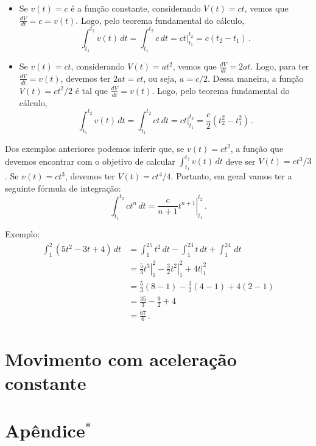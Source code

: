 \documentclass[fontsize=12pt]{scrartcl}
\begin{document}
\begin{itemize}
\item Se $v(t)=c$ é a função constante, considerando $V(t)=ct$, vemos
  que $\frac{dV}{dt}=c=v(t)$. Logo, pelo teorema fundamental do
  cálculo,
  $$\int_{t_1}^{t_2}v(t)\,dt=\int_{t_1}^{t_2}c\,dt=ct|_{t_1}^{t_2}=c(t_2-t_1)\,.$$
\item Se $v(t)=ct$, considerando $V(t)=at^2$, vemos que
  $\frac{dV}{dt}=2at$. Logo, para ter $\frac{dV}{dt}=v(t)$, devemos
  ter $2at=ct$, ou seja, $a=c/2$. Dessa maneira, a função
  $V(t)=ct^2/2$ é tal que $\frac{dV}{dt}=v(t)$. Logo, pelo teorema
  fundamental do cálculo,
  $$\int_{t_1}^{t_2}v(t)\,dt=\int_{t_1}^{t_2}ct\,dt=ct|_{t_1}^{t_2}=\frac{c}{2}(t_2^2-t_1^2)\,.$$
\end{itemize}
Dos exemplos anteriores podemos inferir que, se $v(t)=ct^2$, a função
que devemos encontrar com o objetivo de calcular
$\int_{t_1}^{t_2}v(t)\,dt$ deve ser $V(t)=ct^3/3$. Se $v(t)=ct^3$,
devemos ter $V(t)=ct^4/4$. Portanto, em geral vamos ter a seguinte
fórmula de integração:
$$\int_{t_1}^{t_2}ct^n\,dt=\left.\frac{c}{n+1}t^{n+1}\right|_{t_1}^{t_2}\,.$$

Exemplo:
\begin{equation*}
  \begin{split}
    \int_1^2(5t^2-3t+4)\,dt&=\int_1^25t^2\,dt-\int_1^23t\,dt+\int_1^24\,dt\\
    &=\left.\frac{5}{3}t^3\right|_1^2-\left.\frac{3}{2}t^2\right|_1^2+4t|_1^2\\
    &=\frac{5}{3}(8-1)-\frac{3}{2}(4-1)+4(2-1)\\
    &=\frac{35}{3}-\frac{9}{2}+4\\
    &=\frac{67}{6}\,.
  \end{split}
\end{equation*}

\section{Movimento com aceleração constante}

\section*{Apêndice$^*$}
\end{document}
